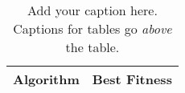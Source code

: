%
%
\begin{table}[t]
    \centering
    \caption{
        \label{tab:plain-table}
        Add your caption here. Captions for tables go {\em above}
        the table.
    }
    \begin{tabular}{lr}
        \toprule
            {\bf Algorithm}  &
            {\bf Best Fitness}
            \\

        \midrule

        

        \bottomrule
    \end{tabular}
\end{table}
